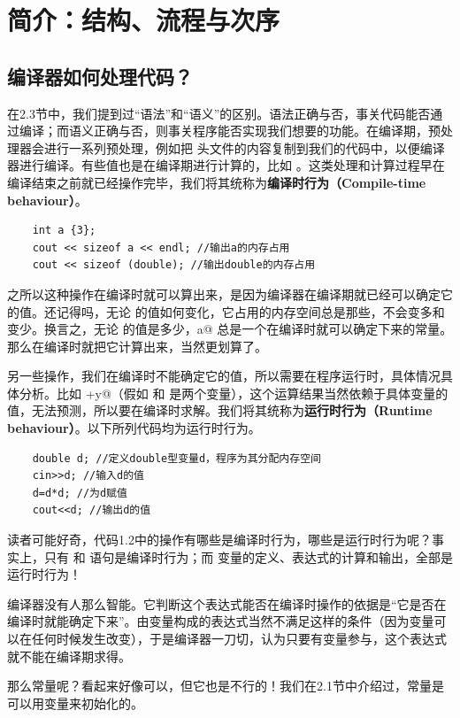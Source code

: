 \section{简介：结构、流程与次序}
\subsection*{编译器如何处理代码？}
在2.3节中，我们提到过``语法''和``语义''的区别。语法正确与否，事关代码能否通过编译；而语义正确与否，则事关程序能否实现我们想要的功能。在编译期，预处理器会进行一系列预处理，例如把 \lstinline@iostream@ 头文件的内容复制到我们的代码中，以便编译器进行编译。有些值也是在编译期进行计算的，比如 \lstinline@sizeof@。这类处理和计算过程早在编译结束之前就已经操作完毕，我们将其统称为\textbf{编译时行为（Compile-time behaviour）}。\par
\begin{lstlisting}
    int a {3};
    cout << sizeof a << endl; //输出a的内存占用
    cout << sizeof (double); //输出double的内存占用
\end{lstlisting}
之所以这种操作在编译时就可以算出来，是因为编译器在编译期就已经可以确定它的值。还记得吗，无论 \lstinline@a@ 的值如何变化，它占用的内存空间总是那些，不会变多和变少。换言之，无论 \lstinline@a@ 的值是多少，\lstinline@sizeof a@ 总是一个在编译时就可以确定下来的常量。那么在编译时就把它计算出来，当然更划算了。\par
另一些操作，我们在编译时不能确定它的值，所以需要在程序运行时，具体情况具体分析。比如 \lstinline@x+y@（假如 \lstinline@x@ 和 \lstinline@y@ 是两个变量），这个运算结果当然依赖于具体变量的值，无法预测，所以要在编译时求解。我们将其统称为\textbf{运行时行为（Runtime behaviour）}。以下所列代码均为运行时行为。
\begin{lstlisting}
    double d; //定义double型变量d，程序为其分配内存空间
    cin>>d; //输入d的值
    d=d*d; //为d赋值
    cout<<d; //输出d的值
\end{lstlisting}\par
读者可能好奇，代码1.2中的操作有哪些是编译时行为，哪些是运行时行为呢？事实上，只有 \lstinline@include@ 和 \lstinline@using@ 语句是编译时行为；而 \lstinline@double@ 变量的定义、表达式的计算和输出，全部是运行时行为！\par
编译器没有人那么智能。它判断这个表达式能否在编译时操作的依据是``它是否在编译时就能确定下来''。由变量构成的表达式当然不满足这样的条件（因为变量可以在任何时候发生改变），于是编译器一刀切，认为只要有变量参与，这个表达式就不能在编译期求得。\par
那么常量呢？看起来好像可以，但它也是不行的！我们在2.1节中介绍过，常量是可以用变量来初始化的。
